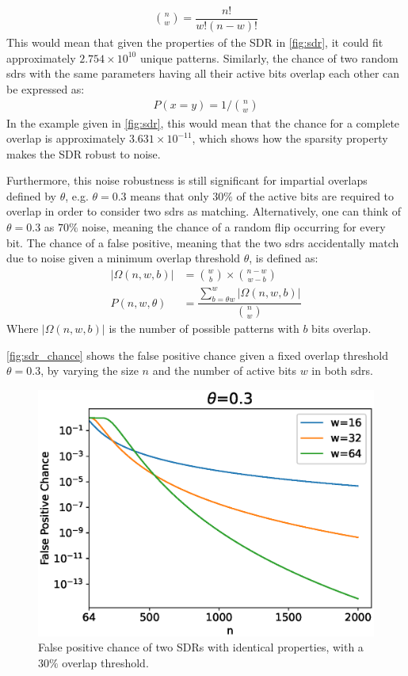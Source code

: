 \begin{align*}
    \binom{n}{w}=\dfrac{n!}{w!(n-w)!}
\end{align*}
This would mean that given the properties of the SDR in \autoref{fig:sdr}, it could fit approximately $2.754\times 10^{10}$ unique patterns. Similarly, the chance of two random \glspl*{sdr} with the same parameters having all their active bits overlap each other can be expressed as:
\begin{align*}
    P(x=y)=1/\binom{n}{w}
\end{align*}
In the example given in \autoref{fig:sdr}, this would mean that the chance for a complete overlap is approximately $3.631\times 10^{-11}$, which shows how the sparsity property makes the SDR robust to noise.
\par
Furthermore, this noise robustness is still significant for impartial overlaps defined by $\theta$, e.g. $\theta=0.3$ means that only $30\%$ of the active bits are required to overlap in order to consider two \glspl*{sdr} as matching. Alternatively, one can think of $\theta=0.3$ as $70\%$ noise, meaning the chance of a random flip occurring for every bit. The chance of a false positive, meaning that the two \glspl{sdr} accidentally match due to noise given a minimum overlap threshold $\theta$, is defined as:
\begin{align*}
    |\Omega(n, w, b)| & =\binom{w}{b}\times \binom{n-w}{w-b}                          \\
    P(n, w, \theta)   & =\dfrac{\sum_{b=\theta w}^{w}|\Omega(n, w, b)|}{\binom{n}{w}}
\end{align*}
Where $|\Omega(n,w,b)|$ is the number of possible patterns with $b$ bits overlap.
\par
\autoref{fig:sdr_chance} shows the false positive chance given a fixed overlap threshold $\theta=0.3$, by varying the size $n$ and the number of active bits $w$ in both \glspl*{sdr}.
\begin{figure}[htb]
    \centering
    \includegraphics[width=\textwidth]{resources/related_works/sdr_chance.eps}
    \caption[SDR False Positive Chance]{False positive chance of two SDRs with identical properties, with a $30\%$ overlap threshold.}
    \label{fig:sdr_chance}
\end{figure}
